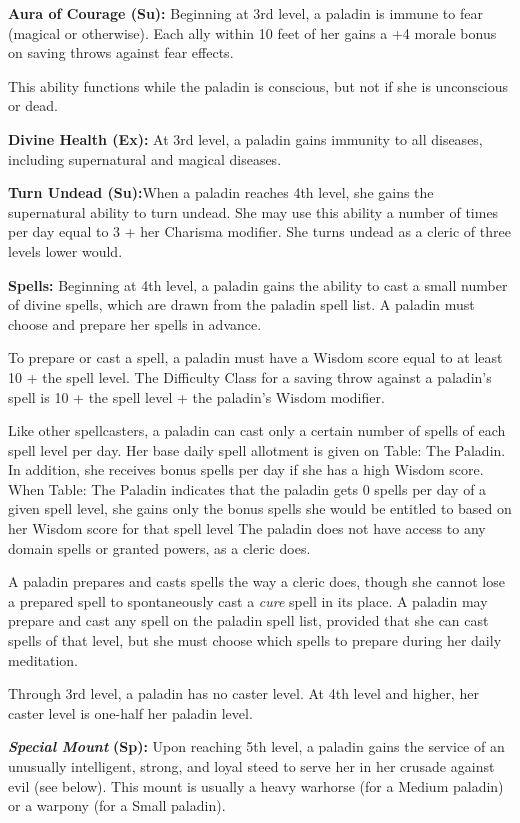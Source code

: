 \documentclass{article}
\begin{document}
\textbf{Aura of Courage (Su):} Beginning at 3rd level, a paladin is immune to fear 
(magical or otherwise). Each ally within 10 feet of her gains a +4 morale bonus 
on saving throws against fear effects.

This ability functions while the paladin is conscious, but not if she is unconscious 
or dead.

\textbf{Divine Health (Ex):} At 3rd level, a paladin gains immunity to all diseases, 
including supernatural and magical diseases.

\textbf{Turn Undead (Su):}When a paladin reaches 4th level, she gains the supernatural 
ability to turn undead. She may use this ability a number of times per day equal 
to 3 + her Charisma modifier. She turns undead as a cleric of three levels lower 
would.

\textbf{Spells:} Beginning at 4th level, a paladin gains the ability to cast a 
small number of divine spells, which are drawn from the paladin spell list. A paladin 
must choose and prepare her spells in advance.

To prepare or cast a spell, a paladin must have a Wisdom score equal to at least 
10 + the spell level. The Difficulty Class for a saving throw against a paladin's 
spell is 10 + the spell level + the paladin's Wisdom modifier.

Like other spellcasters, a paladin can cast only a certain number of spells of 
each spell level per day. Her base daily spell allotment is given on Table: The 
Paladin. In addition, she receives bonus spells per day if she has a high Wisdom 
score. When Table: The Paladin indicates that the paladin gets 0 spells per day 
of a given spell level, she gains only the bonus spells she would be entitled to 
based on her Wisdom score for that spell level The paladin does not have access 
to any domain spells or granted powers, as a cleric does.

A paladin prepares and casts spells the way a cleric does, though she cannot lose 
a prepared spell to spontaneously cast a \textit{cure }spell in its place. A paladin 
may prepare and cast any spell on the paladin spell list, provided that she can 
cast spells of that level, but she must choose which spells to prepare during her 
daily meditation.

Through 3rd level, a paladin has no caster level. At 4th level and higher, her 
caster level is one-half her paladin level.

\textit{\textbf{Special Mount }}\textbf{(Sp):} Upon reaching 5th level, a paladin 
gains the service of an unusually intelligent, strong, and loyal steed to serve 
her in her crusade against evil (see below). This mount is usually a heavy warhorse 
(for a Medium paladin) or a warpony (for a Small paladin).
\end{document}
